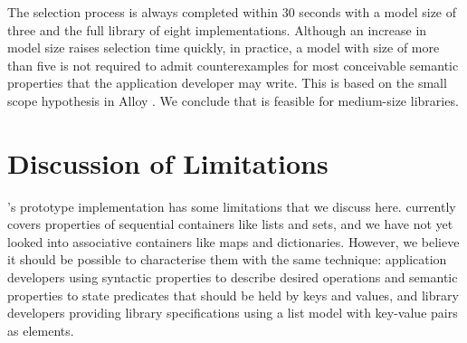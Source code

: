 The selection process is always completed within 30 seconds with a model size of three and the full library of eight implementations.
Although an increase in model size raises selection time quickly, in practice, a model with size of more than five is not required to admit counterexamples for most conceivable semantic properties that the application developer may write. This is based on the small scope hypothesis in Alloy \cite{jackson2012software}.
We conclude that \Primrose{} is feasible for medium-size libraries.

\section{Discussion of Limitations}
\label{chap2:limitations}
\Primrose{}'s prototype implementation has some limitations that we discuss here.
\Primrose{} currently covers properties of sequential containers like lists and sets, and we have not yet looked into associative containers like maps and dictionaries.
However, we believe it should be possible to characterise them with the same technique:
application developers using syntactic properties to describe desired operations and semantic properties to state predicates that should be held by keys and values, and library developers providing library specifications using a list model with key-value pairs as elements.


